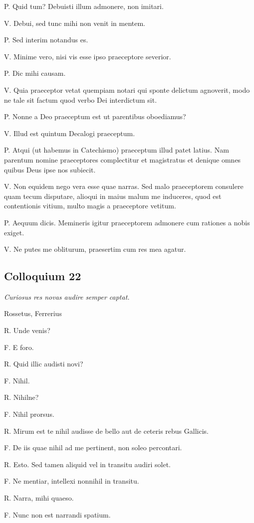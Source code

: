 \documentclass{article}
\begin{document}
P. Quid tum? Debuisti illum admonere, non imitari. 

V. Debui, sed tunc mihi non venit in mentem. 

P. Sed interim notandus es. 

V. Minime vero, nisi vis esse ipso praeceptore severior. 

P. Dic mihi causam. 

V. Quia praeceptor vetat quempiam notari qui sponte delictum agnoverit, modo ne tale sit factum quod verbo Dei interdictum sit. 

P. Nonne a Deo praeceptum est ut parentibus oboediamus?

V. Illud est quintum Decalogi praeceptum. 

P. Atqui (ut habemus in Catechismo) praeceptum illud patet latius. Nam parentum nomine praeceptores complectitur et magistratus et denique omnes quibus Deus ipse nos subiecit. 

V. Non equidem nego vera esse quae narras. Sed malo praeceptorem consulere quam tecum disputare, alioqui in maius malum me induceres, quod est contentionis vitium, multo magis a praeceptore vetitum. 

P. Aequum dicis. Memineris igitur praeceptorem admonere cum rationes a nobis exiget. 

V. Ne putes me obliturum, praesertim cum res mea agatur. 

\subsection{Colloquium 22}
\emph{Curiosus res novas audire semper captat.}

Rossetus, Ferrerius

R. Unde venis?

F. E foro. 

R. Quid illic audisti novi?

F. Nihil. 

R. Nihilne?

F. Nihil prorsus. 

R. Mirum est te nihil audisse de bello aut de ceteris rebus Gallicis. 

F. De iis quae nihil ad me pertinent, non soleo percontari. 

R. Esto. Sed tamen aliquid vel in transitu audiri solet. 

F. Ne mentiar, intellexi nonnihil in transitu. 

R. Narra, mihi quaeso. 

F. Nunc non est narrandi spatium. 
\end{document}
